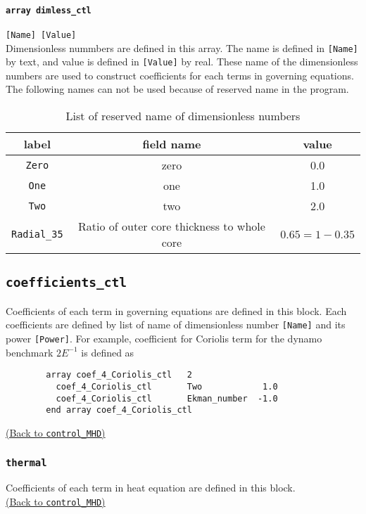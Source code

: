 \paragraph{\tt array dimless\_ctl}
\label{href_t:dimless_ctl}
\verb|[Name] [Value]| \\
Dimensionless nummbers are defined in this array. The name is defined in \verb|[Name]| by text, and value is defined in \verb|[Value]| by real. These name of the dimensionless numbers are used to construct coefficients for each terms in governing equations. The following names can not be used because of reserved name in the program.
%
\begin{table}[htp]
\caption{List of reserved name of dimensionless numbers}
\begin{center}
\begin{tabular}{|c|c|c|}
\hline
 label & field name & value \\ \hline
\verb|Zero| & zero & 0.0 \\
\verb|One| &  one &  1.0 \\
\verb|Two| &  two &  2.0 \\
\verb|Radial_35| & Ratio of outer core thickness to whole core & $0.65 = 1 - 0.35$ \\ \hline
\end{tabular}
\end{center}
\label{table:reserved_params}
\end{table}
%

\subsection{\tt coefficients\_ctl}
\label{href_t:coefficients_ctl}
Coefficients of each term in governing equations are defined in this block.
Each coefficients are defined by list of name of dimensionless number \verb|[Name]| and its power \verb|[Power]|. For example, coefficient for Coriolis term for the dynamo benchmark $ 2E^{-1}$ is defined as
%
\begin{verbatim}
        array coef_4_Coriolis_ctl   2
          coef_4_Coriolis_ctl       Two            1.0
          coef_4_Coriolis_ctl       Ekman_number  -1.0
        end array coef_4_Coriolis_ctl
\end{verbatim}
%
\hyperref[href_i:coefficients_ctl]{(Back to {\tt control\_MHD})}

\subsubsection{\tt thermal}
\label{href_t:thermal}
Coefficients of each term in heat equation are defined in this block. \\
\hyperref[href_i:thermal]{(Back to {\tt control\_MHD})}

